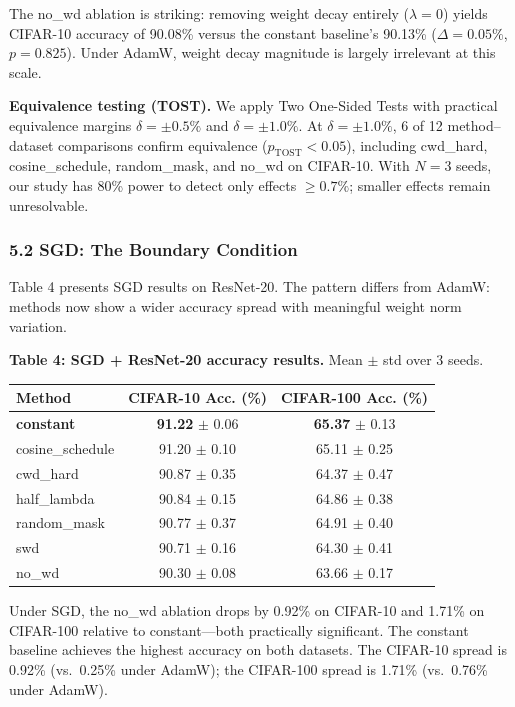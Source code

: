 \documentclass[
]{article}
\begin{document}
The no\_wd ablation is striking: removing weight decay entirely
(\(\lambda = 0\)) yields CIFAR-10 accuracy of 90.08\% versus the
constant baseline's 90.13\% (\(\Delta = 0.05\%\), \(p = 0.825\)). Under
AdamW, weight decay magnitude is largely irrelevant at this scale.

\textbf{Equivalence testing (TOST).} We apply Two One-Sided Tests with
practical equivalence margins \(\delta = \pm 0.5\%\) and
\(\delta = \pm 1.0\%\). At \(\delta = \pm 1.0\%\), 6 of 12
method--dataset comparisons confirm equivalence
(\(p_{\mathrm{TOST}} < 0.05\)), including cwd\_hard, cosine\_schedule,
random\_mask, and no\_wd on CIFAR-10. With \(N = 3\) seeds, our study
has 80\% power to detect only effects \(\geq 0.7\%\); smaller effects
remain unresolvable.

\hypertarget{sgd-the-boundary-condition}{%
\subsubsection{5.2 SGD: The Boundary
Condition}\label{sgd-the-boundary-condition}}

Table 4 presents SGD results on ResNet-20. The pattern differs from
AdamW: methods now show a wider accuracy spread with meaningful weight
norm variation.

\textbf{Table 4: SGD + ResNet-20 accuracy results.} Mean \(\pm\) std
over 3 seeds.

\begin{longtable}[]{@{}lcc@{}}
\toprule\noalign{}
Method & CIFAR-10 Acc. (\%) & CIFAR-100 Acc. (\%) \\
\midrule\noalign{}
\endhead
\bottomrule\noalign{}
\endlastfoot
\textbf{constant} & \textbf{91.22} \(\pm\) 0.06 & \textbf{65.37} \(\pm\)
0.13 \\
cosine\_schedule & 91.20 \(\pm\) 0.10 & 65.11 \(\pm\) 0.25 \\
cwd\_hard & 90.87 \(\pm\) 0.35 & 64.37 \(\pm\) 0.47 \\
half\_lambda & 90.84 \(\pm\) 0.15 & 64.86 \(\pm\) 0.38 \\
random\_mask & 90.77 \(\pm\) 0.37 & 64.91 \(\pm\) 0.40 \\
swd & 90.71 \(\pm\) 0.16 & 64.30 \(\pm\) 0.41 \\
no\_wd & 90.30 \(\pm\) 0.08 & 63.66 \(\pm\) 0.17 \\
\end{longtable}

Under SGD, the no\_wd ablation drops by 0.92\% on CIFAR-10 and 1.71\% on
CIFAR-100 relative to constant---both practically significant. The
constant baseline achieves the highest accuracy on both datasets. The
CIFAR-10 spread is 0.92\% (vs.~0.25\% under AdamW); the CIFAR-100 spread
is 1.71\% (vs.~0.76\% under AdamW).
\end{document}
